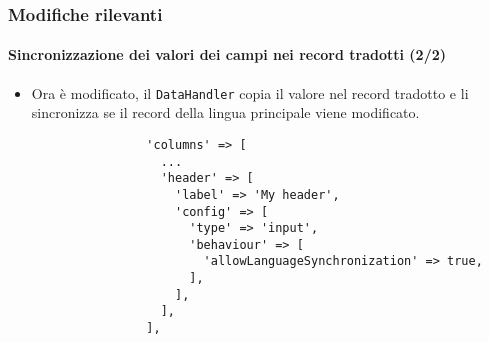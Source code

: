 
\begin{frame}[fragile]
	\frametitle{Modifiche rilevanti}
	\framesubtitle{Sincronizzazione dei valori dei campi nei record tradotti (2/2)}

	\lstset{basicstyle=\tiny\ttfamily}

	\begin{itemize}
		\item Ora è modificato, il \texttt{DataHandler} copia il valore nel record tradotto
			e li sincronizza se il record della lingua principale viene modificato.

			\begin{lstlisting}
				'columns' => [
				  ...
				  'header' => [
				    'label' => 'My header',
				    'config' => [
				      'type' => 'input',
				      'behaviour' => [
				        'allowLanguageSynchronization' => true,
				      ],
				    ],
				  ],
				],
			\end{lstlisting}

	\end{itemize}

\end{frame}


